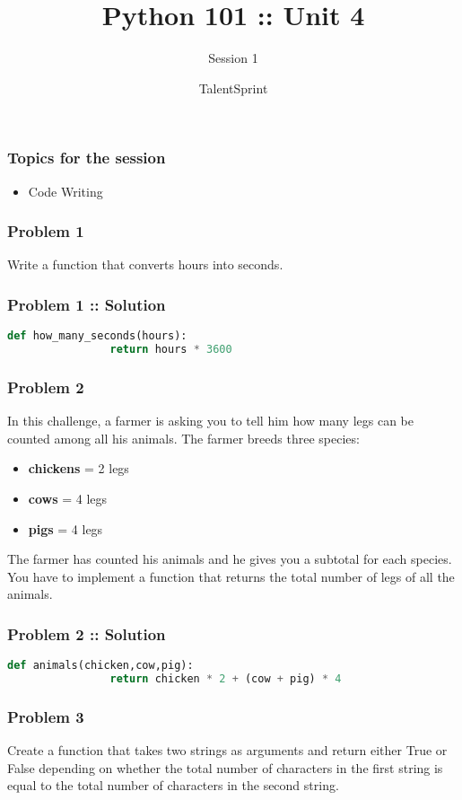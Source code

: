 \documentclass[14pt]{beamer}
\title{Python 101 :: Unit 4}
\subtitle{Session 1}
\date{}
\author[TS]{TalentSprint}
\begin{document}
    \begin{frame}
        \titlepage
    \end{frame}
    \begin{frame}
        \frametitle{Topics for the session}
        \begin{itemize}
            \item Code Writing
        \end{itemize}
    \end{frame}

    \begin{frame}
        \frametitle{Problem 1}
        \alert{Write a function that converts hours into seconds.}
    \end{frame}
    \begin{frame}[containsverbatim]
        \frametitle{Problem 1 ::  Solution}
        \begin{lstlisting}[language=Python]
            def how_many_seconds(hours):
                return hours * 3600
        \end{lstlisting}
    \end{frame}

    \begin{frame}
        \frametitle{Problem 2}
        In this challenge, a farmer is asking you to tell him how many legs can be counted among all his animals. The farmer breeds three species:
        \begin{itemize}
            \item \textbf{chickens} = 2 legs
            \item \textbf{cows} = 4 legs
            \item \textbf{pigs} = 4 legs
        \end{itemize}
        The farmer has counted his animals and he gives you a subtotal for each species. \alert{You have to implement a function that returns the total number of legs of all the animals.}
    \end{frame}

    \begin{frame}[containsverbatim]
        \frametitle{Problem 2 :: Solution}
        \begin{lstlisting}[language=Python]
            def animals(chicken,cow,pig):
                return chicken * 2 + (cow + pig) * 4
        \end{lstlisting}
    \end{frame}

    \begin{frame}
        \frametitle{Problem 3}
        \alert{Create a function that takes two strings as arguments and return either True or False depending on whether the total number of characters in the first string is equal to the total number of characters in the second string.}
    \end{frame}
\end{document}
